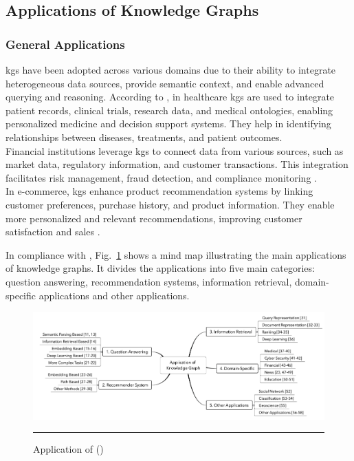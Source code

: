 \subsection*{Applications of Knowledge Graphs}

\subsubsection*{General Applications}
\glspl{kg} have been adopted across various domains due to their ability to integrate heterogeneous data sources, provide semantic context, and enable advanced querying and reasoning.
According to \textcite{Kapanipathi2020}, in healthcare \glspl{kg} are used to integrate patient records, clinical trials, research data, and medical ontologies, enabling personalized medicine and decision support systems. They help in identifying relationships between diseases, treatments, and patient outcomes.
\\Financial institutions leverage \glspl{kg} to connect data from various sources, such as market data, regulatory information, and customer transactions. This integration facilitates risk management, fraud detection, and compliance monitoring \cite{Tchechmedjiev2019}.
\\In e-commerce, \glspl{kg} enhance product recommendation systems by linking customer preferences, purchase history, and product information. They enable more personalized and relevant recommendations, improving customer satisfaction and sales \cite{Zhang2021}.

In compliance with \textcite{Zou2020}, Fig.~\ref{fig:kg-application-fields} shows a mind map illustrating the main applications of knowledge graphs. It divides the applications into five main categories: question answering, recommendation systems, information retrieval, domain-specific applications and other applications.

\begin{figure}[htbp]
    \centering
 \includegraphics[width=\textwidth]{03_Figures/literature-review/kg-application-fields.png}
     \rule{35em}{0.5pt}
    \caption{Application of  (\textcite{Zou2020})} 
 \label{fig:kg-application-fields}
\end{figure}

